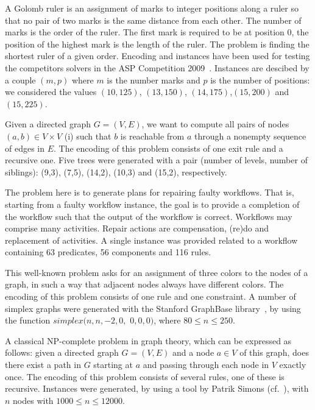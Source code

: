 \documentclass[preprint]{tlp}
\newcommand{\NP}{{\rm NP}\xspace}
\begin{document}
A Golomb ruler is an assignment of marks to integer positions along a ruler so
that no pair of two marks is the same distance from each other.
The number of marks is the order of the ruler. The first mark is required to be at position 0,
the position of the highest mark is the length of the ruler.
The problem is finding the shortest ruler of a given order.
Encoding and instances have been used for testing
the competitors solvers in the ASP Competition 2009~\cite{devebogetr09a}.
Instances are descibed by a couple $(m,p)$ where  $m$ is the number marks
and $p$ is the number of positions: we considered the values $(10,125)$, $(13,150)$,
$(14,175)$,$(15,200)$ and $(15,225)$.

 Given a directed graph $G=(V,E)$,
we want to compute all pairs of nodes $(a,b) \in V \times V$ (i)
such that $b$ is reachable from $a$ through a nonempty sequence of
edges in $E$. The encoding of this problem consists of one exit rule
and a recursive one. Five trees were generated
with a pair (number of levels, number of siblings):
(9,3), (7,5), (14,2), (10,3) and (15,2), respectively.

The problem here is to generate plans for repairing faulty
workflows. That is, starting from a faulty workflow instance, the
goal is to provide a completion of the workflow such that the
output of the workflow is correct. Workflows may comprise many
activities. Repair actions are compensation, (re)do and
replacement of activities. A single instance was provided
related to a workflow containing 63 predicates,
56 components and 116 rules.

 This well-known problem asks for an assignment of
three colors to the nodes of a graph, in such a way that adjacent
nodes always have different colors. The encoding of this problem
consists of one rule and one constraint. A number of simplex graphs were
generated with the Stanford GraphBase library~\cite{knut-94}, by
using the function $simplex(n,n,-2,0,$ $0,0,0)$, where $80\leq n \leq 250$.

A classical \NP-complete problem in graph theory, which can be
expressed as follows: given a directed graph $G=(V,E)$ and a node $a
\in V$ of this graph, does there exist a path in $G$ starting at $a$
and passing through each node in $V$ exactly once. The encoding of
this problem consists of several rules, one of these is recursive.
Instances were generated, by  using a tool by Patrik Simons
(cf.~\cite{simo-2000}), with $n$ nodes  with $1000 \leq n \leq 12000$.
\end{document}
